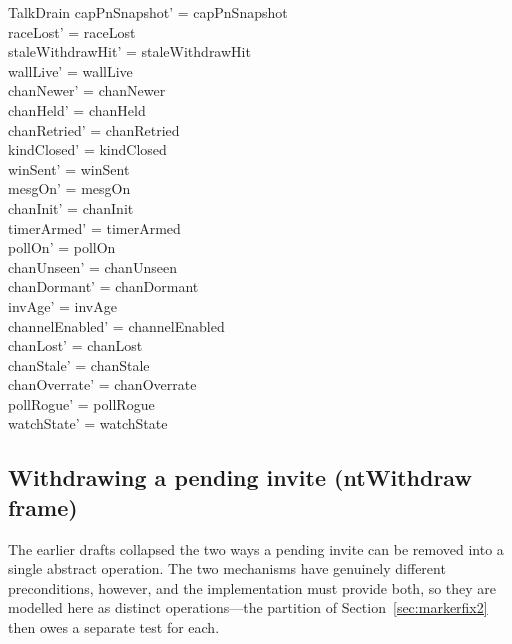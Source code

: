 \documentclass[a4paper,10pt,fleqn]{article}
\begin{document}
\begin{schema}{TalkDrain}
  capPnSnapshot' = capPnSnapshot \\
  raceLost' = raceLost \\
  staleWithdrawHit' = staleWithdrawHit \\
  wallLive' = wallLive \\
  chanNewer' = chanNewer \\
  chanHeld' = chanHeld \\
  chanRetried' = chanRetried \\
  kindClosed' = kindClosed \\
  winSent' = winSent \\
  mesgOn' = mesgOn \\
  chanInit' = chanInit \\
  timerArmed' = timerArmed \\
  pollOn' = pollOn \\
  chanUnseen' = chanUnseen \\
  chanDormant' = chanDormant \\
  invAge' = invAge \\
  channelEnabled' = channelEnabled \\
  chanLost' = chanLost \\
  chanStale' = chanStale \\
  chanOverrate' = chanOverrate \\
  pollRogue' = pollRogue \\
  watchState' = watchState
\end{schema}

\subsection{Withdrawing a pending invite (ntWithdraw frame)}

The earlier drafts collapsed the two ways a pending invite can be removed
into a single abstract operation.  The two mechanisms have genuinely
different preconditions, however, and the implementation must provide both,
so they are modelled here as distinct operations---the partition of
Section~\ref{sec:markerfix2} then owes a separate test for each.
\end{document}
